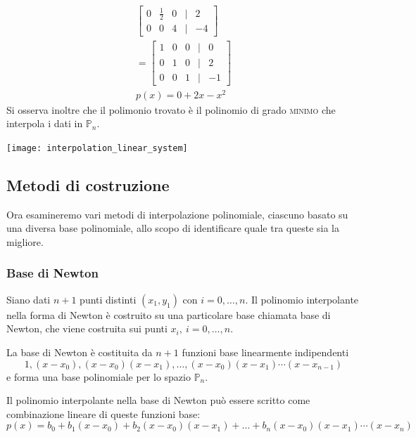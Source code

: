\documentclass{article}
\begin{document}
\begin{example}
\begin{equation*}
\begin{aligned}
\begin{bmatrix}
               0 & \frac{1}{2} & 0 & | & 2\\ 
               0 & 0 & 4 & | & -4
           \end{bmatrix}\\
           =\begin{bmatrix}
               1 & 0 & 0 & | & 0\\ 
               0 & 1 & 0 & | & 2\\ 
               0 & 0 & 1 & | & -1
           \end{bmatrix}\\
           p(x)=0+2x-x^2
       \end{aligned} 
    \end{equation*}
Si osserva inoltre che il polimonio trovato è il polinomio di grado
\textsc{minimo} che interpola i dati in $\mathbb{P}_n$.
    \begin{center}
        \texttt{[image: interpolation\_linear\_system]}
    \end{center}
\end{example}
\subsection{Metodi di costruzione}
Ora esamineremo vari metodi di interpolazione polinomiale, ciascuno basato su
una diversa base polinomiale, allo scopo di identificare quale tra queste 
sia la migliore.
\subsubsection{Base di Newton}
Siano dati $n+1$ punti distinti $(x_1,y_1)$ con $i=0,\ldots,n$. Il polinomio
interpolante nella forma di Newton è costruito su una particolare base chiamata base
di Newton, che viene costruita sui punti $x_i,\ i=0,\ldots,n$.

La base di Newton è costituita da $n+1$ funzioni base linearmente
indipendenti
$$1,(x-x_0),(x-x_0)(x-x_1),\ldots,(x-x_0)(x-x_1)\cdots(x-x_{n-1})$$
e forma una base polinomiale per lo spazio $\mathbb{P}_n$.

Il polinomio interpolante nella base di Newton può essere scritto come combinazione lineare di
queste funzioni base:
$$p(x)=b_0+b_1(x-x_0)+b_2(x-x_0)(x-x_1)+\ldots+b_n(x-x_0)(x-x_1)\cdots(x-x_n)$$
\end{document}
